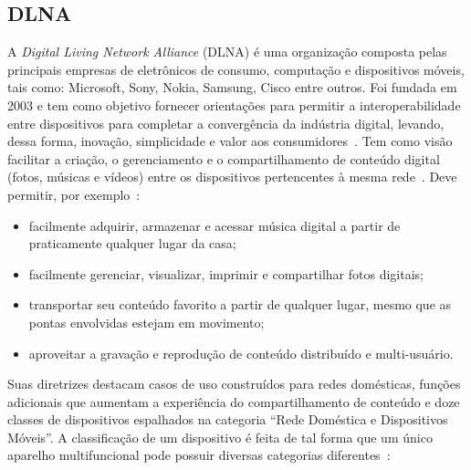 \subsection{DLNA}

A \emph{Digital Living Network Alliance} (DLNA) é uma organização composta pelas principais empresas de eletrônicos de consumo, computação e dispositivos móveis, tais como: Microsoft, Sony, Nokia, Samsung, Cisco entre outros. Foi fundada em 2003 e tem como objetivo fornecer orientações para permitir a interoperabilidade entre dispositivos para completar a convergência da indústria digital, levando, dessa forma, inovação, simplicidade e valor aos consumidores~\cite{dlnaoverview}. Tem como visão facilitar a criação, o gerenciamento e o compartilhamento de conteúdo digital (fotos, músicas e vídeos) entre os dispositivos pertencentes à mesma rede~\cite{dlnahdvideostreaming}. Deve permitir, por exemplo~\cite{dlnaoverview}:

\begin{itemize}
	\item facilmente adquirir, armazenar e acessar música digital a partir de praticamente qualquer lugar da casa;
	\item facilmente gerenciar, visualizar, imprimir e compartilhar fotos digitais;
	\item transportar seu conteúdo favorito a partir de qualquer lugar, mesmo que as pontas envolvidas estejam em movimento;
	\item aproveitar a gravação e reprodução de conteúdo distribuído e multi-usuário.
\end{itemize}

Suas diretrizes destacam casos de uso construídos para redes domésticas, funções adicionais que aumentam a experiência do compartilhamento de conteúdo e doze classes de dispositivos espalhados na categoria ``Rede Doméstica e Dispositivos Móveis''. A classificação de um dispositivo é feita de tal forma que um único aparelho multifuncional pode possuir diversas categorias diferentes~\cite{dlnahdvideostreaming, dlnaclasses}:

